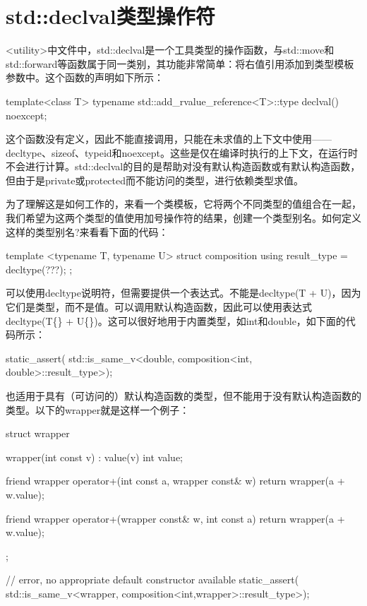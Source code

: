 \section{std::declval类型操作符}
<utility>中文件中，std::declval是一个工具类型的操作函数，与std::move和std::forward等函数属于同一类别，其功能非常简单：将右值引用添加到类型模板参数中。这个函数的声明如下所示：

\begin{cpp}
template<class T>
typename std::add_rvalue_reference<T>::type declval() noexcept;
\end{cpp}

这个函数没有定义，因此不能直接调用，只能在未求值的上下文中使用——decltype、sizeof、typeid和noexcept。这些是仅在编译时执行的上下文，在运行时不会进行计算。std::declval的目的是帮助对没有默认构造函数或有默认构造函数，但由于是private或protected而不能访问的类型，进行依赖类型求值。

为了理解这是如何工作的，来看一个类模板，它将两个不同类型的值组合在一起，我们希望为这两个类型的值使用加号操作符的结果，创建一个类型别名。如何定义这样的类型别名?来看看下面的代码：

\begin{cpp}
template <typename T, typename U>
struct composition
{
	using result_type = decltype(???);
};
\end{cpp}

可以使用decltype说明符，但需要提供一个表达式。不能是decltype(T + U)，因为它们是类型，而不是值。可以调用默认构造函数，因此可以使用表达式decltype(T\{\} + U\{\})。这可以很好地用于内置类型，如int和double，如下面的代码所示：

\begin{cpp}
static_assert(
	std::is_same_v<double,
		composition<int, double>::result_type>);
\end{cpp}

也适用于具有（可访问的）默认构造函数的类型，但不能用于没有默认构造函数的类型。以下的wrapper就是这样一个例子：

\begin{cpp}
struct wrapper
{
	wrapper(int const v) : value(v){}
	int value;
	
	friend wrapper operator+(int const a, wrapper const& w)
	{
		return wrapper(a + w.value);
	}

	friend wrapper operator+(wrapper const& w, int const a)
	{
		return wrapper(a + w.value);
	}
};

// error, no appropriate default constructor available
static_assert(
	std::is_same_v<wrapper,
		composition<int,wrapper>::result_type>);
\end{cpp}

